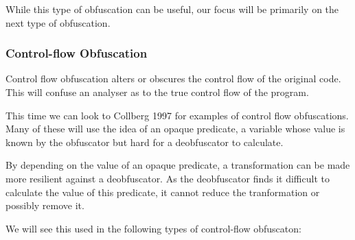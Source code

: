 \documentclass[twoside,a4paper]{report}
\begin{document}
While this type of obfuscation can be useful, our focus will be primarily on the next type of obfuscation.

\subsubsection{Control-flow Obfuscation}

Control flow obfuscation alters or obscures the control flow of the original code. This will confuse an analyser as to the
true control flow of the program.

This time we can look to Collberg 1997 \cite{taxobftrans} for examples of control flow obfuscations. Many of these will use the idea
of an opaque predicate, a variable whose value is known by the obfuscator but hard for a deobfuscator to calculate.

By depending on the value of an opaque predicate, a transformation can be made more resilient against a deobfuscator. As the
deobfuscator finds it difficult to calculate the value of this predicate, it cannot reduce the tranformation or possibly
remove it.

We will see this used in the following types of control-flow obfuscaton:
\end{document}
